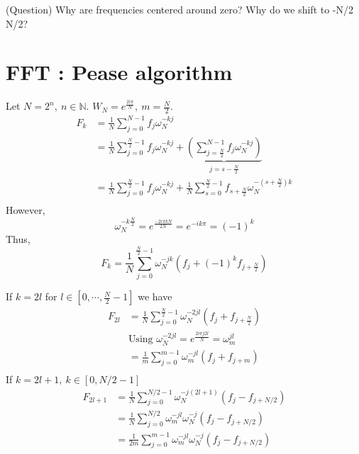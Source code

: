 (Question) Why are frequencies centered around zero? Why do we shift to -N/2 N/2? 


\section{FFT : Pease algorithm}
\label{sec:FFT : Pease algorithm}
Let $ N = 2^n,\ n \in \mathbb{N}$. $ W_N = e^{ \frac{ 2i\pi }{ N } },\ m = \frac{ N }{ 2 }
$. 
\begin{align*}
    F_k &= \frac{ 1 }{ N } \sum_{j=0}^{N-1} f_j\omega_N^{-kj} \\
     &= \frac{ 1 }{ N } \sum_{j=0}^{ \frac{ N }{ 2 } - 1} f_j \omega _{ N }^{ -kj } + 
     \underbrace{\left( \sum_{j= \frac{ N }{ 2 } }^{N-1} f_j \omega _{ N }^{ -kj }
     \right)}_{j = s - \frac{ N }{ 2 } } \\
      &= \frac{ 1 }{ N } \sum_{j=0}^{ \frac{ N }{ 2 } - 1} f_j \omega _{ N }^{ -kj } +
      \frac{ 1 }{ N } \sum_{s=0}^{ \frac{ N }{ 2 } -1 } f_{s + \frac{ N }{ 2 } } \omega 
      _{ N }^{ -\left( s + \frac{ N }{ 2 } \right) k }  \\ 
\end{align*}
However, 
\[
    \omega _{ N }^{ -k \frac{ N }{ 2 }  } = e^{ \frac{ -2i\pi k N  }{ 2N  } } = e^{-ik\pi}
    = \left( -1\right) ^k
\]
Thus, 
\[
F_k = \frac{ 1 }{ N } \sum_{j=0}^{ \frac{ N }{ 2 } - 1} \omega _{ N }^{ -jk } \left( f_j +
\left( -1\right) ^k f_{j+ \frac{ N }{ 2 } } \right) 
\]

If $ k = 2l $ for $ l \in [0, \cdots, \frac{ N }{ 2 } - 1] $ we have 
\begin{align*}
    F_{2l}  &= \frac{ 1 }{ N } \sum_{j=0}^{ \frac{ N }{ 2 } -1} \omega _{ N }^{ -2jl } 
    \left( f_j + f_{j + \frac{ N }{ 2 } } \right) \\ 
            &\text{Using } \omega _{ N }^{ -2jl } = e^{ \frac{ 2i\pi j2l }{ N } } = \omega
            _{ m }^{ jl }  \\
            & = \frac{ 1 }{ m } \sum_{j=0}^{m-1} \omega _{ m }^{ -jl } \left( f_j +
            f_{j+m}\right)  \\ 
\end{align*}
If $ k = 2l + 1, \ k \in [0, N/2 - 1] $ 
\begin{align*}
    F_{2l + 1} &= \frac{ 1 }{ N } \sum_{j=0}^{N/2 - 1} \omega _{ N }^{ -j\left( 2l+1\right)
    } \left( f_j - f _{ j + N/2  }^{  } \right) \\
     &= \frac{ 1 }{ N } \sum_{j=0}^{N/2} \omega _{ m }^{ -jl } \omega _{ N }^{ -j } \left(
     f_j - f _{ j+ N/2 }^{  } \right)  \\ 
      &= \frac{ 1 }{ 2m } \sum_{j=0}^{m-1} \omega _{ m }^{ -jl } \omega _{ N }^{ -j }
      \left( f_j - f _{ j + N/2  }^{  } \right)  \\ 
\end{align*}

